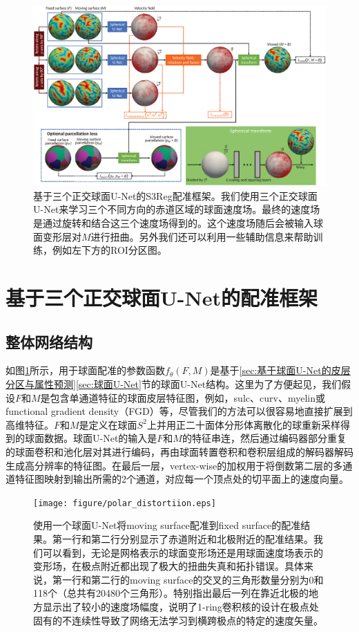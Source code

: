 \begin{figure}[t]
	\centering
	\includegraphics[width=\linewidth]{figure/network.eps}
	\caption{基于三个正交球面U-Net的S3Reg配准框架。我们使用三个正交球面U-Net来学习三个不同方向的赤道区域的球面速度场。最终的速度场是通过旋转和结合这三个速度场得到的。这个速度场随后会被输入球面变形层对$M$进行扭曲。另外我们还可以利用一些辅助信息来帮助训练，例如左下方的ROI分区图。}
	\label{fig:S3Reg_network}
\end{figure}

\section{基于三个正交球面U-Net的配准框架}\label{sec:基于三个正交球面U-Net的配准框架}

\subsection{整体网络结构}
如图\ref{fig:S3Reg_network}所示，用于球面配准的参数函数$f_\theta(F,M)$是基于\ref{sec:基于球面U-Net的皮层分区与属性预测}\ref{sec:球面U-Net}节的球面U-Net结构。这里为了方便起见，我们假设$F$和$M$是包含单通道特征的球面皮层特征图，例如，sulc、curv、myelin或functional gradient density（FGD）等，尽管我们的方法可以很容易地直接扩展到高维特征。$F$和$M$是定义在球面$S^2$上并用正二十面体分形体\cite{fischl2012freesurfer}离散化的球重新采样得到的球面数据。球面U-Net的输入是$F$和$M$的特征串连，然后通过编码器部分重复的球面卷积和池化层对其进行编码，再由球面转置卷积和卷积层组成的解码器解码生成高分辨率的特征图。在最后一层，vertex-wise的加权用于将倒数第二层的多通道特征图映射到输出所需的2个通道，对应每一个顶点处的切平面上的速度向量。

\begin{figure}[t]
	\centering
	\texttt{[image: figure/polar\_distortiion.eps]}
	\caption{使用一个球面U-Net将moving surface配准到fixed surface的配准结果。第一行和第二行分别显示了赤道附近和北极附近的配准结果。我们可以看到，无论是网格表示的球面变形场还是用球面速度场表示的变形场，在极点附近都出现了极大的扭曲失真和拓扑错误。具体来说，第一行和第二行的moving surface的交叉的三角形数量\cite{moller1997fast}分别为0和118个（总共有20480个三角形）。特别指出最后一列在靠近北极的地方显示出了较小的速度场幅度，说明了1-ring卷积核的设计在极点处固有的不连续性导致了网络无法学习到横跨极点的特定的速度矢量。}
	\label{fig:polar_distortiion}
\end{figure}

